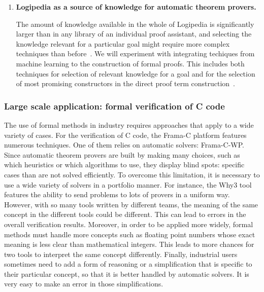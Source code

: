 \begin{enumerate}[\bf(a)]
\item{\bf Logipedia as a source of knowledge for automatic theorem provers.}

  The amount of knowledge available in the whole of Logipedia is
significantly larger than in any library of an individual proof assistant,
and selecting the knowledge relevant for a
particular goal might require more complex techniques than
before~\cite{Irving-deepmath}.  We will experiment with integrating techiques
from machine learning to the construction of formal proofs. This includes both techniques
for selection of relevant knowledge for a goal and for the selection
of most promising constructors in the direct proof term
construction~\cite{ZielenkiewiczSchubert2016}.
\end{enumerate}

\subsubsection*{Large scale application: formal verification of C code}

The use of formal methods in industry requires approaches
that apply to a wide variety of cases. For the verification of C code,
the Frama-C platform features numerous techniques. One of them relies
on automatic solvers: Frama-C-WP. Since automatic theorem provers are
built by making many choices, such as which heuristics or which
algorithms to use, they display blind spots: specific cases than are not solved
efficiently. To overcome this limitation, it is
necessary to use a wide variety of solvers in a portfolio manner. For
instance, the Why3 tool features the ability to send problems to lots
of provers in a uniform way. However, with so many tools written by
different teams, the meaning of the same concept in the different
tools could be different. This can lead to errors in the overall
verification results. Moreover, in order to be applied more widely,
formal methods must handle more concepts such as floating point
numbers whose exact meaning is less clear than mathematical
integers. This leads to more chances for two tools to interpret the
same concept differently. Finally, industrial users sometimes need to
add a form of reasoning or a simplification that is specific to their
particular concept, so that it is better handled by automatic
solvers. It is very easy to make an error in those simplifications.

